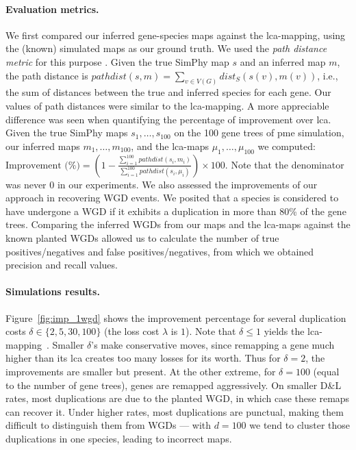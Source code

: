 \documentclass[10pt]{article}
\begin{document}
\paragraph{Evaluation metrics.}  We first  compared our inferred gene-species maps against the lca-mapping, using the (known) simulated maps as our ground truth.  
We used the \emph{path distance metric} for this purpose \cite{moulton1999retractions}.
Given the true SimPhy map $s$ and an inferred map $m$, the path distance is  
$pathdist(s, m) = \sum_{v \in V(G)} dist_S(s(v), m(v))$, i.e., the sum of distances between the true and inferred species for each gene.  Our values of path distances were similar to the lca-mapping. A more appreciable difference was seen when quantifying the percentage of improvement over lca.  Given the true SimPhy maps $s_1, \ldots, s_{100}$ on the 100 gene trees of pme simulation, our inferred maps $m_1, \ldots, m_{100}$, and  the lca-maps $\mu_1, \ldots, \mu_{100}$ we computed:
$\text{Improvement (\%)} = \left(1 - \frac{\sum_{i=1}^{100} pathdist(s_i, m_i)}{\sum_{i=1}^{100} pathdist(s_i, \mu_i)}\right) \times 100$. 
Note that the denominator was never $0$ in our experiments.
We also assessed the improvements of our approach in recovering WGD events. 
We posited that a species is considered to have undergone a WGD if it exhibits a duplication in more than 80\% of the gene trees.  Comparing the inferred WGDs from our maps and the lca-maps against the known planted WGDs allowed us to calculate the number of true positives/negatives and false positives/negatives, from which we obtained precision and recall values.




\paragraph*{Simulations results.}  Figure~\ref{fig:imp_1wgd} shows the improvement percentage for several duplication costs $\delta \in \{2, 5, 30, 100\}$ (the loss cost $\lambda$ is $1$).  Note that $\delta \leq 1$ yields the lca-mapping~\cite{dondi2019reconciling}. Smaller $\delta$'s make conservative moves, since remapping a gene much higher than its lca creates too many losses for its worth.  Thus for $\delta = 2$, the improvements are smaller but present.  At the other extreme, for $\delta = 100$ (equal to the number of gene trees), genes are remapped aggressively.   On smaller D\&L rates, most duplications are due to the planted WGD, in which case these remaps can recover it.  Under higher rates, most duplications are punctual, making them difficult to distinguish them from WGDs --- with $d = 100$ we tend to cluster those duplications in one species, leading to incorrect maps.  
\end{document}
